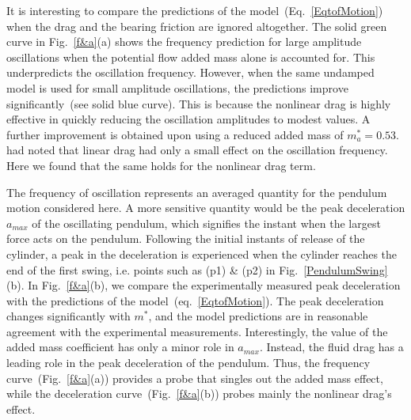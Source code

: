 \documentclass{jfm}
\begin{document}
It is interesting to compare the predictions of the model~(Eq.~\ref{EqtofMotion}) when the drag and the bearing friction are ignored altogether. The solid green curve in Fig.~\ref{f&a}(a) shows the frequency prediction for large amplitude oscillations when the potential flow added mass alone is accounted for. This underpredicts the oscillation frequency. However, when the same undamped model is used for small amplitude oscillations, the predictions improve significantly~(see solid blue curve). This is because the nonlinear drag is highly effective in quickly reducing the oscillation amplitudes to modest values. A further improvement is obtained upon using a reduced added mass of $m^*_a = 0.53$. \cite{neill2007pendulum} had noted that linear drag had only a small effect on the oscillation frequency.  Here we found that the same holds for the nonlinear drag term.


The frequency of oscillation represents an averaged quantity for the pendulum motion considered here. A  more sensitive quantity would be the peak deceleration $a_{max}$ of the oscillating pendulum, which signifies the instant when the largest force acts on the pendulum. 
Following the initial instants of release of the cylinder, a peak in the deceleration is experienced when the cylinder reaches the end of the first swing, i.e. points such as (p1) \& (p2) in Fig.~\ref{PendulumSwing}(b).  In Fig.~\ref{f&a}(b), we compare the experimentally measured peak deceleration with the predictions of the model~(eq.~\ref{EqtofMotion}). The peak deceleration changes significantly with $m^*$, and the model predictions are in reasonable agreement with the experimental measurements. Interestingly, the value of the added mass coefficient has only a minor role in $a_{max}$. Instead, the fluid drag has a leading role in the peak deceleration of the pendulum.
Thus, the frequency curve~(Fig.~\ref{f&a}(a)) provides a probe that singles out the added mass effect, while the deceleration curve~(Fig.~\ref{f&a}(b)) probes mainly the nonlinear drag's effect.
\end{document}
